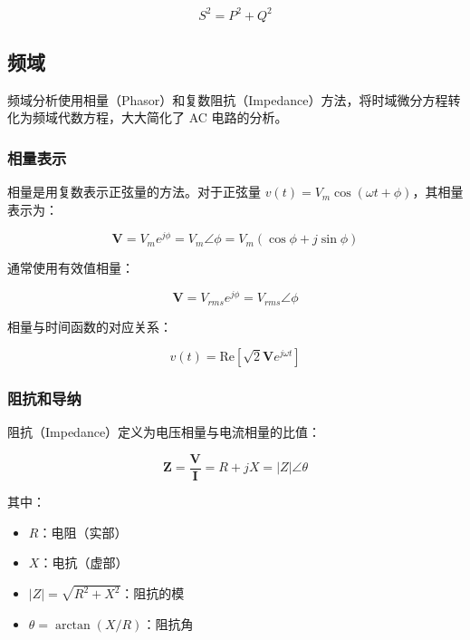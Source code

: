 \begin{equation}
S^2 = P^2 + Q^2 \label{eq:power-triangle}
\end{equation}

\subsection{频域}

频域分析使用相量（Phasor）和复数阻抗（Impedance）方法，将时域微分方程转化为频域代数方程，大大简化了 AC 电路的分析。

\subsubsection{相量表示}

相量是用复数表示正弦量的方法。对于正弦量 $v(t) = V_m \cos(\omega t + \phi)$，其相量表示为：

\begin{equation}
\mathbf{V} = V_m e^{j\phi} = V_m \angle \phi = V_m (\cos \phi + j \sin \phi) \label{eq:phasor-representation}
\end{equation}

通常使用有效值相量：

\begin{equation}
\mathbf{V} = V_{rms} e^{j\phi} = V_{rms} \angle \phi \label{eq:rms-phasor}
\end{equation}

相量与时间函数的对应关系：

\begin{equation}
v(t) = \text{Re}[\sqrt{2} \mathbf{V} e^{j\omega t}] \label{eq:phasor-to-time}
\end{equation}

\subsubsection{阻抗和导纳}

阻抗（Impedance）定义为电压相量与电流相量的比值：

\begin{equation}
\mathbf{Z} = \frac{\mathbf{V}}{\mathbf{I}} = R + jX = |Z| \angle \theta \label{eq:impedance}
\end{equation}

其中：
\begin{itemize}
  \item $R$：电阻（实部）
  \item $X$：电抗（虚部）
  \item $|Z| = \sqrt{R^2 + X^2}$：阻抗的模
  \item $\theta = \arctan(X/R)$：阻抗角
\end{itemize}

